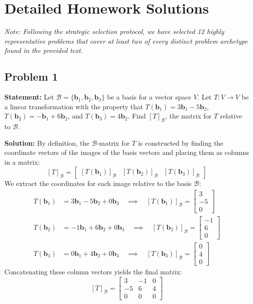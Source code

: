 \documentclass[11pt, a4paper]{article}
\theoremstyle{definition}
\theoremstyle{remark}
\begin{document}
\newpage
\section{Detailed Homework Solutions}
\textit{Note: Following the strategic selection protocol, we have selected 12 highly representative problems that cover at least two of every distinct problem archetype found in the provided text.}

\subsection{Problem 1}
\textbf{Statement:} Let $\mathcal{B} = \{\mathbf{b}_1, \mathbf{b}_2, \mathbf{b}_3\}$ be a basis for a vector space $V$. Let $T: V \to V$ be a linear transformation with the property that $T(\mathbf{b}_1) = 3\mathbf{b}_1 - 5\mathbf{b}_2$, $T(\mathbf{b}_2) = -\mathbf{b}_1 + 6\mathbf{b}_2$, and $T(\mathbf{b}_3) = 4\mathbf{b}_2$. Find $[T]_\mathcal{B}$, the matrix for $T$ relative to $\mathcal{B}$.

\textbf{Solution:}
By definition, the $\mathcal{B}$-matrix for $T$ is constructed by finding the coordinate vectors of the images of the basis vectors and placing them as columns in a matrix:
\[
[T]_\mathcal{B} = \begin{bmatrix} [T(\mathbf{b}_1)]_\mathcal{B} & [T(\mathbf{b}_2)]_\mathcal{B} & [T(\mathbf{b}_3)]_\mathcal{B} \end{bmatrix}
\]
We extract the coordinates for each image relative to the basis $\mathcal{B}$:
\begin{align*}
    T(\mathbf{b}_1) &= 3\mathbf{b}_1 - 5\mathbf{b}_2 + 0\mathbf{b}_3 \quad \implies \quad [T(\mathbf{b}_1)]_\mathcal{B} = \begin{bmatrix} 3 \\ -5 \\ 0 \end{bmatrix} \\
    T(\mathbf{b}_2) &= -1\mathbf{b}_1 + 6\mathbf{b}_2 + 0\mathbf{b}_3 \quad \implies \quad [T(\mathbf{b}_2)]_\mathcal{B} = \begin{bmatrix} -1 \\ 6 \\ 0 \end{bmatrix} \\
    T(\mathbf{b}_3) &= 0\mathbf{b}_1 + 4\mathbf{b}_2 + 0\mathbf{b}_3 \quad \implies \quad [T(\mathbf{b}_3)]_\mathcal{B} = \begin{bmatrix} 0 \\ 4 \\ 0 \end{bmatrix}
\end{align*}
Concatenating these column vectors yields the final matrix:
\[
[T]_\mathcal{B} = \begin{bmatrix} 3 & -1 & 0 \\ -5 & 6 & 4 \\ 0 & 0 & 0 \end{bmatrix}
\]
\end{document}
